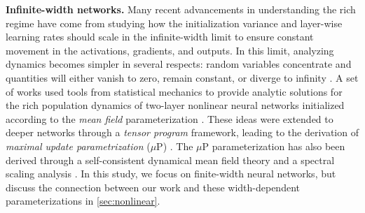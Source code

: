 \documentclass{article}
\theoremstyle{plain}
\theoremstyle{definition}
\theoremstyle{remark}
\begin{document}
\textbf{Infinite-width networks.}
%
Many recent advancements in understanding the rich regime have come from studying how the initialization variance and layer-wise learning rates should scale in the infinite-width limit to ensure constant movement in the activations, gradients, and outputs.
%
In this limit, analyzing dynamics becomes simpler in several respects: random variables concentrate and quantities will either vanish to zero, remain constant, or diverge to infinity \cite{luo2021phase}.
%
A set of works used tools from statistical mechanics to provide analytic solutions for the rich population dynamics of two-layer nonlinear neural networks initialized according to the \emph{mean field} parameterization \cite{mei2018mean, chizat2018global, sirignano2020mean, rotskoff2022trainability}.
%
These ideas were extended to deeper networks through a \emph{tensor program} framework, leading to the derivation of \emph{maximal update parametrization} ($\mu\mathrm{P}$) \cite{yang2020feature, yang2022tensor}.
%
The $\mu\mathrm{P}$ parameterization has also been derived through a self-consistent dynamical mean field theory \cite{bordelon2022self} and a spectral scaling analysis \cite{yang2023spectral}.
%
In this study, we focus on finite-width neural networks, but discuss the connection between our work and these width-dependent parameterizations in \cref{sec:nonlinear}.



\end{document}
